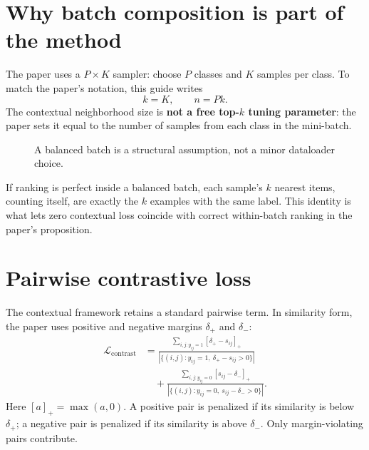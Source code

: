 \documentclass[11pt,oneside,openany]{book}
\theoremstyle{myplain}
\theoremstyle{definition}
\newcommand{\card}[1]{\left|#1\right|}
\newcommand{\paperEq}[1]{\tag{P#1}}
\begin{document}
\section{Why batch composition is part of the method}

The paper uses a $P\times K$ sampler: choose $P$ classes and $K$ samples per class. To match the paper's notation, this guide writes
\[
  k=K,\qquad n=Pk.
\]
The contextual neighborhood size is \textbf{not a free top-$k$ tuning parameter}: the paper sets it equal to the number of samples from each class in the mini-batch.

\begin{figure}[H]
\centering
{}
\caption{A balanced batch is a structural assumption, not a minor dataloader choice.}
\label{fig:balanced-batch}
\end{figure}

\begin{conceptbox}[title=Why $k$ equals samples per class]
If ranking is perfect inside a balanced batch, each sample's $k$ nearest items, counting itself, are exactly the $k$ examples with the same label. This identity is what lets zero contextual loss coincide with correct within-batch ranking in the paper's proposition.
\end{conceptbox}

\section{Pairwise contrastive loss}

The contextual framework retains a standard pairwise term. In similarity form, the paper uses positive and negative margins $\delta_+$ and $\delta_-$:
\begin{equation*}
\begin{aligned}
\mathcal L_{\mathrm{contrast}}
&=
\frac{\sum_{i,j:y_{ij}=1}[\delta_+-s_{ij}]_+}
{\card{\{(i,j):y_{ij}=1,\ \delta_+-s_{ij}>0\}}}\\
&\quad+
\frac{\sum_{i,j:y_{ij}=0}[s_{ij}-\delta_-]_+}
{\card{\{(i,j):y_{ij}=0,\ s_{ij}-\delta_->0\}}}.
\end{aligned}
\paperEq{29}
\label{eq:contrastive}
\end{equation*}
Here $[a]_+=\max(a,0)$. A positive pair is penalized if its similarity is below $\delta_+$; a negative pair is penalized if its similarity is above $\delta_-$. Only margin-violating pairs contribute.
\end{document}
